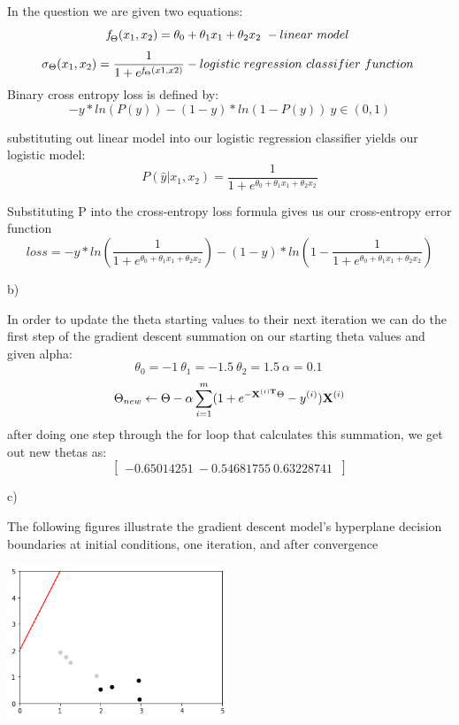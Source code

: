 \documentclass{homework}
\begin{document}
In the question we are given two equations:
\[
\emph{f} _{\Theta}(x _{1}, x _{2}) = \theta _{0} + \theta _{1}x_{1} + \theta _{2}x_{2}\ - linear\ model\
\]
\[
\sigma _{\Theta}(x _{1}, x _{2})  = \frac{1}{1+e^{\emph{f} _{\Theta}(x1, x2)}} - logistic\ regression\ classifier\ function\
\]
Binary cross entropy loss is defined by:
\[
    -y*ln(P(y))-(1-y)*ln(1-P(y))\ y\in(0,1)
\]

substituting out linear model into our logistic regression classifier yields our logistic model:
\[
P(\hat{y}|x _{1},x _{2}) = \frac{1}{1+e^{\theta _{0} + \theta _{1}x_{1} + \theta _{2}x_{2}}} 
\]

Substituting P into the cross-entropy loss formula gives us our cross-entropy error function
\[
    loss = -y*ln(\frac{1}{1+e^{\theta _{0} + \theta _{1}x_{1} + \theta _{2}x_{2}}})-(1-y)*ln(1-\frac{1}{1+e^{\theta _{0} + \theta _{1}x_{1} + \theta _{2}x_{2}}})
\]

b)

In order to update the theta starting values to their next iteration we can do the first step of the gradient descent summation on our starting theta values and given alpha:
\[
\theta _{0} = -1\
\theta _{1} = -1.5\
\theta _{2} = 1.5\
\alpha =0.1\
\]
\[
\Theta_{new}\leftarrow \Theta-\alpha\sum_{i=1}^{m} (1+e^{-\bold{X}^{(i)\bold{T}}\Theta}-y^{(i)})\bold{X}^{(i)}
\]
after doing one step through the for loop that calculates this summation, we get out new thetas as:
\[
\begin{bmatrix}
 -0.65014251\ -0.54681755\ 0.63228741\
\end{bmatrix}
\]

c)

The following figures illustrate the gradient descent model's hyperplane decision boundaries at initial conditions, one iteration, and after convergence

\centering
\includegraphics[width=250]{2b0.png}
\end{document}
